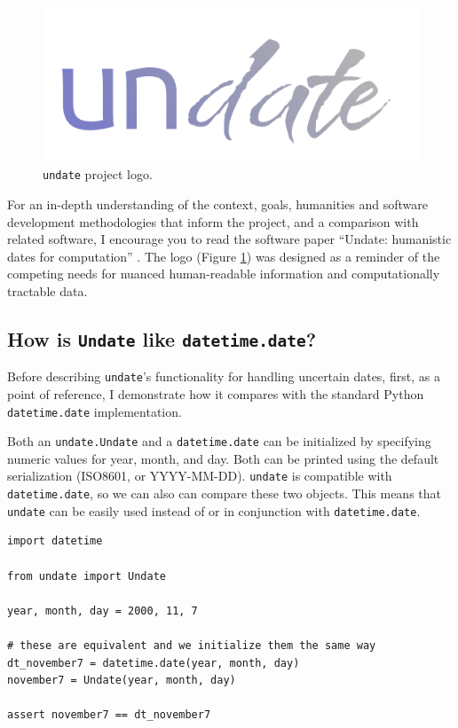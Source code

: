 \documentclass[final]{anthology-ch} %
\begin{document}
\begin{figure}[h]
  \centering
  \includegraphics[width=0.4\linewidth]{figures/undate_logo.png}
  \caption{\texttt{undate} project logo.}
  \label{fig:logo}
\end{figure}

For an in-depth understanding of the context, goals, humanities and software development methodologies that inform the project, and a comparison with related software, I encourage you to read the software paper ``Undate: humanistic dates for computation'' \cite{koeser_undate_2025}.  The logo (Figure \ref{fig:logo}) was designed as a reminder of the competing needs for nuanced human-readable information and computationally tractable data.

\subsection{How is \texttt{Undate} like \texttt{datetime.date}?} \label{sec:intro_details}

Before describing \texttt{undate}’s functionality for handling uncertain dates, first, as a point of reference,  I demonstrate how it compares with the standard Python \texttt{datetime.date} implementation.

Both an \texttt{undate.Undate} and a \texttt{datetime.date} can be initialized by specifying numeric values for year, month, and day. Both can be printed using the default serialization (ISO8601, or YYYY-MM-DD). \texttt{undate} is compatible with \texttt{datetime.date}, so we can also can compare these two objects. This means that \texttt{undate} can be easily used instead of or in conjunction with \texttt{datetime.date}.

\begin{verbatim}
import datetime

from undate import Undate

year, month, day = 2000, 11, 7

# these are equivalent and we initialize them the same way
dt_november7 = datetime.date(year, month, day)
november7 = Undate(year, month, day)

assert november7 == dt_november7
\end{verbatim}
\end{document}
